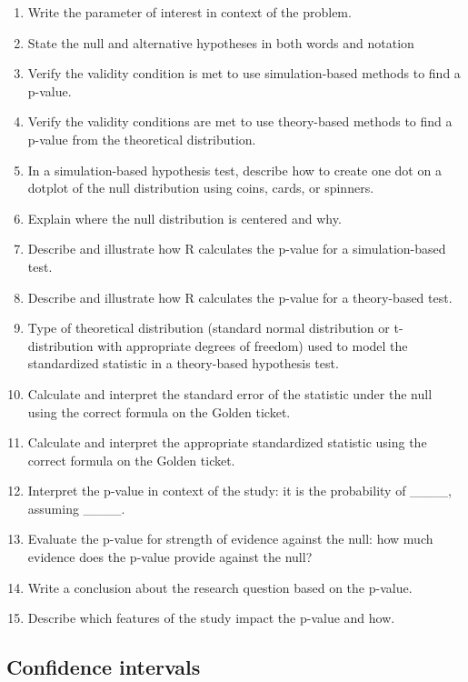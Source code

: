 \documentclass[
]{report}
\begin{document}
\begin{enumerate}
\def\labelenumi{\arabic{enumi}.}
\setcounter{enumi}{11}
\item
  Write the parameter of interest in context of the problem.
\item
  State the null and alternative hypotheses in both words and notation
\item
  Verify the validity condition is met to use simulation-based methods to find a p-value.
\item
  Verify the validity conditions are met to use theory-based methods to find a p-value from the theoretical distribution.
\item
  In a simulation-based hypothesis test, describe how to create one dot on a dotplot of the null distribution using coins, cards, or spinners.
\item
  Explain where the null distribution is centered and why.
\item
  Describe and illustrate how R calculates the p-value for a simulation-based test.
\item
  Describe and illustrate how R calculates the p-value for a theory-based test.
\item
  Type of theoretical distribution (standard normal distribution or t-distribution with appropriate degrees of freedom) used to model the standardized statistic in a theory-based hypothesis test.
\item
  Calculate and interpret the standard error of the statistic under the null using the correct formula on the Golden ticket.
\item
  Calculate and interpret the appropriate standardized statistic using the correct formula on the Golden ticket.
\item
  Interpret the p-value in context of the study: it is the probability of \_\_\_\_, assuming \_\_\_\_.
\item
  Evaluate the p-value for strength of evidence against the null: how much evidence does the p-value provide against the null?
\item
  Write a conclusion about the research question based on the p-value.
\item
  Describe which features of the study impact the p-value and how.
\end{enumerate}

\subsection{Confidence intervals}\label{confidence-intervals}
\end{document}
